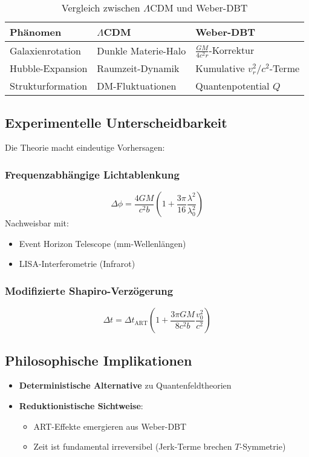 \begin{table}[h]
\centering
\caption{Vergleich zwischen $\Lambda$CDM und Weber-DBT}
\label{tab:comparison}
\begin{tabular}{lll}
\toprule
\textbf{Phänomen} & \textbf{$\Lambda$CDM} & \textbf{Weber-DBT} \\
\midrule
Galaxienrotation & Dunkle Materie-Halo & $\frac{GM}{4c^2r}$-Korrektur \\
Hubble-Expansion & Raumzeit-Dynamik & Kumulative $v_r^2/c^2$-Terme \\
Strukturformation & DM-Fluktuationen & Quantenpotential $Q$ \\
\bottomrule
\end{tabular}
\end{table}

\subsection{Experimentelle Unterscheidbarkeit}
Die Theorie macht eindeutige Vorhersagen:

\subsubsection{Frequenzabhängige Lichtablenkung}
\begin{equation}
\Delta\phi = \frac{4GM}{c^2b}\left(1 + \frac{3\pi}{16}\frac{\lambda^2}{\lambda_0^2}\right)
\end{equation}
Nachweisbar mit:
\begin{itemize}
\item Event Horizon Telescope (mm-Wellenlängen)
\item LISA-Interferometrie (Infrarot)
\end{itemize}

\subsubsection{Modifizierte Shapiro-Verzögerung}
\begin{equation}
\Delta t = \Delta t_{\mathrm{ART}} \left(1 + \frac{3\pi GM}{8c^2b}\frac{v_0^2}{c^2}\right)
\end{equation}

\subsection{Philosophische Implikationen}
\begin{itemize}
\item \textbf{Deterministische Alternative} zu Quantenfeldtheorien
\item \textbf{Reduktionistische Sichtweise}:
\begin{itemize}
\item ART-Effekte emergieren aus Weber-DBT
\item Zeit ist fundamental irreversibel (Jerk-Terme brechen $T$-Symmetrie)
\end{itemize}
\end{itemize}

